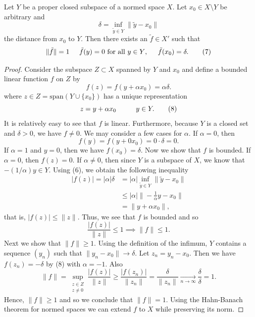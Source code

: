 \begin{lemma}\label{4.6-7}
   Let \( Y  \) be a proper closed subspace of a normed space \( X  \). Let \( {x}_{0} \in X \setminus  Y  \) be arbitrary and  
   \[  \delta = \inf_{\tilde{y} \in Y } \|\tilde{y} - {x}_{0}\| \tag{6} \]
   the distance from \( {x}_{0}  \) to \( Y  \). Then there exists an \( \tilde{f} \in X' \) such that 
   \[  \|\tilde{f}\| = 1 \hspace{5mm} \tilde{f}(y) = 0 \ \text{for all \( y \in Y \)}, \hspace{5mm} \tilde{f}({x}_{0}) = \delta. \tag{7} \]
\end{lemma}
\begin{proof}
Consider the subspace \( Z \subset X  \) spanned by \( Y  \) and \( {x}_{0} \) and define a bounded linear function \( f  \) on \( Z  \) by 
\[  f(z) = f(y + \alpha {x}_{0}) = \alpha \delta. \tag{\( y \in Y \)} \]
where \( z \in Z = \text{span}(Y \cup \{  {x}_{0} \} ) \) has a unique representation
\[  z = y + \alpha {x}_{0} \hspace{10mm}  y \in Y. \tag{8}\]
It is relatively easy to see that \( f  \) is linear. Furthermore, because \( Y  \) is a closed set and \( \delta > 0 \), we have \( f \neq 0  \). We may consider a few cases for \( \alpha  \). If \( \alpha = 0  \), then 
\[ f(y) = f(y + 0 {x}_{0}) = 0 \cdot \delta = 0.   \]
If \( \alpha = 1  \) and \( y = 0  \), then we have \( f({x}_{0}) = \delta \). Now we show that \( f  \) is bounded. If \( \alpha = 0  \), then \( f(z) = 0  \). If \( \alpha \neq 0  \), then since \( Y  \) is a subspace of \( X  \), we know that \( - (1/ \alpha) y \in Y  \). Using (6), we obtain the following inequality
\begin{align*}
    | f(z)  |  = | \alpha | \delta &= | \alpha | \inf_{\tilde{y} \in Y} \|\tilde{y} - {x}_{0}\| \\
                                   &\leq | \alpha |  \| - \frac{ 1 }{ \alpha } y - {x}_{0} \| \\
                                   &= \|y + \alpha {x}_{0} \|,
\end{align*}
that is, \( | f(z)  | \leq \|z \|  \). Thus, we see that \( f  \) is bounded and so 
\[  \frac{ | f(z) |  }{ \|z\| }  \leq 1  \implies \|f\| \leq 1.  \]
Next we show that \( \|f\| \geq 1   \). Using the definition of the infimum, \( Y \) contains a sequence \( ({y}_{n}) \) such that \( \|{y}_{n} - {x}_{0}\| \to \delta \). Let \( {z}_{n} = {y}_{n} - {x}_{0} \). Then we have \( f({z}_{n}) = - \delta  \) by (8) with \( \alpha = -1  \). Also 
\[  \|f\| = \sup_{\substack{z \in Z \\ z \neq 0}} \frac{ | f(z) |  }{ \|z \| }  \geq \frac{ | f({z}_{n}) |  }{ \|{z}_{n}\| }  = \frac{ \delta }{ \|{z}_{n}\| } \underset{n \to \infty}{\longrightarrow} \frac{ \delta }{ \delta } = 1. \]
Hence, \( \|f\| \geq 1  \) and so we conclude that \( \|f\| = 1  \). Using the Hahn-Banach theorem for normed spaces we can extend \( f  \) to \( X  \) while preserving its norm.
\end{proof}

